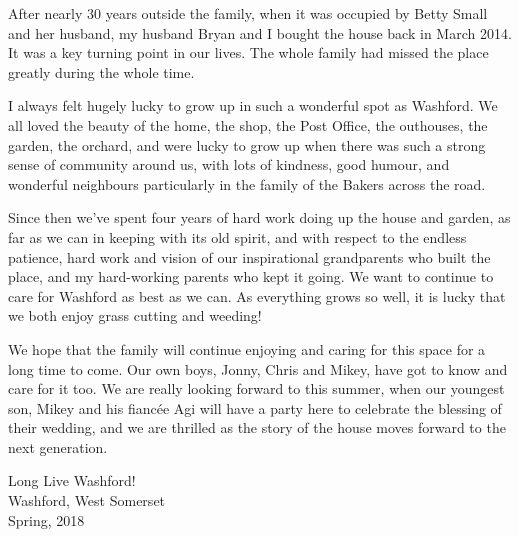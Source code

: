 
After nearly 30 years outside the family, when it was occupied by Betty Small and her husband, my husband Bryan and I bought the house back in March 2014. It was a key turning point in our lives. The whole family had missed the place greatly during the whole time.

I always felt hugely lucky to grow up in such a wonderful spot as Washford. We all loved the beauty of the home, the shop, the Post Office, the outhouses, the garden, the orchard, and were lucky to grow up when there was such a strong sense of community around us, with lots of kindness, good humour, and wonderful neighbours particularly in the family of the Bakers across the road.

Since then we’ve spent four years of hard work doing up the house and garden, as far as we can in keeping with its old spirit, and with respect to the endless patience, hard work and vision of our inspirational grandparents who built the place, and my hard-working parents who kept it going. We want to continue to care for Washford as best as we can. As everything grows so well, it is lucky that we both enjoy grass cutting and weeding!

We hope that the family will continue enjoying and caring for this space for a long time to come. Our own boys, Jonny, Chris and Mikey, have got to know and care for it too. We are really looking forward to this summer, when our youngest son, Mikey and his fiancée Agi will have a party here to celebrate the blessing of their wedding, and we are thrilled as the story of the house moves forward to the next generation.

Long Live Washford!\\


Washford, West Somerset\\
Spring, 2018
